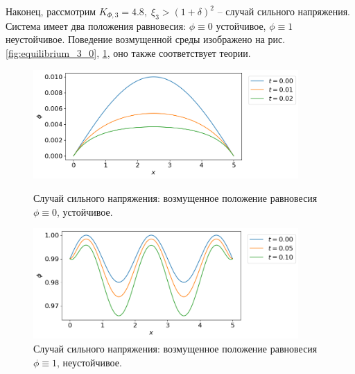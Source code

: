 Наконец, рассмотрим $K_{\Phi, 3} = 4.8, \; \xi_3 > (1 + \delta)^2$ -- случай сильного напряжения. Система имеет два положения равновесия: $\phi \equiv 0$ устойчивое, $\phi \equiv 1$ неустойчивое. Поведение возмущенной среды изображено на рис. \ref{fig:equilibrium_3_0}, \ref{fig:equilibrium_3_1}, оно также соответствует теории.

\begin{figure}[!t]
    \centering
    \includegraphics[width=0.9\textwidth]{figures/equilibrium_3_0.png}
    \vspace{-0.3cm}
    \caption{Случай сильного напряжения: возмущенное положение равновесия $\phi \equiv 0$, устойчивое.}
    \label{fig:equilibrium_3_0}
    \vspace{0.5cm}
    
    \includegraphics[width=0.9\textwidth]{figures/equilibrium_3_1.png}
    \vspace{-0.3cm}
    \caption{Случай сильного напряжения: возмущенное положение равновесия $\phi \equiv 1$, неустойчивое.}
    \label{fig:equilibrium_3_1}
\end{figure}